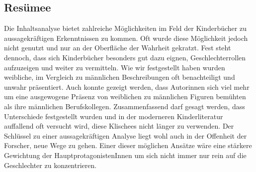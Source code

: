   \subsection{Resümee}

    Die Inhaltsanalyse bietet zahlreiche Möglichkeiten im Feld der Kinderbücher
    zu aussagekräftigen Erkenntnissen zu kommen. Oft wurde diese Möglichkeit
    jedoch nicht genutzt und nur an der Oberfläche der Wahrheit gekratzt. Fest
    steht dennoch, dass sich Kinderbücher besonders gut dazu eignen,
    Geschlechterrollen aufzuzeigen und weiter zu vermitteln. Wie wir
    festgestellt haben wurden weibliche, im Vergleich zu männlichen
    Beschreibungen oft benachteiligt und unwahr präsentiert. Auch konnte gezeigt
    werden, dass Autorinnen sich viel mehr um eine ausgewogene Präsenz von
    weiblichen zu männlichen Figuren bemühten als ihre männlichen
    Berufskollegen. Zusammenfassend darf gesagt werden, dass Unterschiede
    festgestellt wurden und in der moderneren Kinderliteratur auffallend oft
    versucht wird, diese Klischees nicht länger zu verwenden. Der Schlüssel zu
    einer aussagekräftigen Analyse liegt wohl auch in der Offenheit der
    Forscher, neue Wege zu gehen. Einer dieser möglichen Ansätze wäre eine
    stärkere Gewichtung der HauptprotagonistenInnen um sich nicht immer nur rein
    auf die Geschlechter zu konzentrieren.